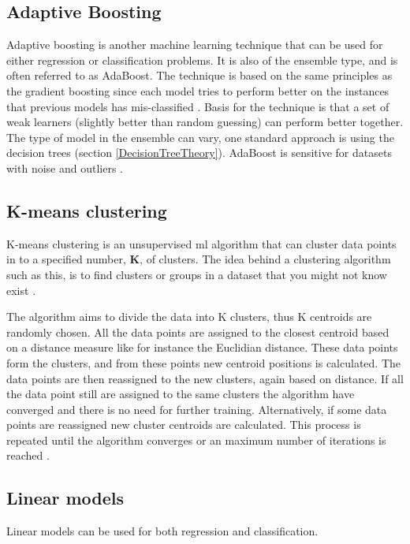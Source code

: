 \documentclass[english, a4paper]{report}
\begin{document}
{{        \subsection{Adaptive Boosting}\label{AdaBoostTheory}
        {
            Adaptive boosting is another machine learning technique that can be used for either regression or classification problems. It is also of the ensemble type, and is often referred to as AdaBoost. The technique is based on the same principles as the gradient boosting since each model tries to perform better on the instances that previous models has mis-classified \cite{understandingMLAlgos}. Basis for the technique is that a set of weak learners (slightly better than random guessing) can perform better together. The type of model in the ensemble can vary, one standard approach is using the decision trees (section \ref{DecisionTreeTheory}). AdaBoost is sensitive for datasets with noise and outliers \cite{pythonML}.    
        }
        
        \subsection{K-means clustering}\label{K-MeansClusteringTheory}
        {
            K-means clustering is an unsupervised \gls{ml} algorithm that can cluster data points in to a specified number, \textbf{K}, of clusters. The idea behind a clustering algorithm such as this, is to find clusters or groups in a dataset that you might not know exist \cite{pythonML}. 
            \par
            The algorithm aims to divide the data into K clusters, thus K centroids are randomly chosen. All the data points are assigned to the closest centroid based on a distance measure like for instance the Euclidian distance. These data points form the clusters, and from these points new centroid positions is calculated. The data points are then reassigned to the new clusters, again based on distance. If all the data point still are assigned to the same clusters the algorithm have converged and there is no need for further training. Alternatively, if some data points are reassigned new cluster centroids are calculated. This process is repeated until the algorithm converges or an maximum number of iterations is reached \cite{pythonML}.
        }
        
        \subsection{Linear models}\label{LinearModelsTheory}
        {
            Linear models can be used for both regression and classification. 
        
}}}
\end{document}
